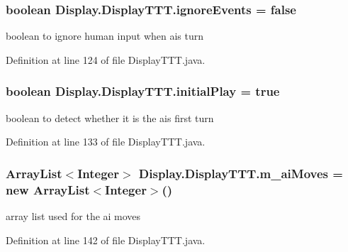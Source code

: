 \subsubsection[{ignore\+Events}]{\setlength{\rightskip}{0pt plus 5cm}boolean Display.\+Display\+T\+T\+T.\+ignore\+Events = false\hspace{0.3cm}{\ttfamily [private]}}\label{class_display_1_1_display_t_t_t_a713fdaab41d88af675c9f54dfcdb87a2}
boolean to ignore human input when ai\textquotesingle{}s turn 

Definition at line 124 of file Display\+T\+T\+T.\+java.

\hypertarget{class_display_1_1_display_t_t_t_a7a6b9526f0a795edccb3911009d74842}{}
\subsubsection[{initial\+Play}]{\setlength{\rightskip}{0pt plus 5cm}boolean Display.\+Display\+T\+T\+T.\+initial\+Play = true\hspace{0.3cm}{\ttfamily [private]}}\label{class_display_1_1_display_t_t_t_a7a6b9526f0a795edccb3911009d74842}
boolean to detect whether it is the ai\textquotesingle{}s first turn 

Definition at line 133 of file Display\+T\+T\+T.\+java.

\hypertarget{class_display_1_1_display_t_t_t_aaa3a8705876d9e60253f6c4599966ae9}{}
\subsubsection[{m\+\_\+ai\+Moves}]{\setlength{\rightskip}{0pt plus 5cm}Array\+List$<$Integer$>$ Display.\+Display\+T\+T\+T.\+m\+\_\+ai\+Moves = new Array\+List$<$Integer$>$()\hspace{0.3cm}{\ttfamily [private]}}\label{class_display_1_1_display_t_t_t_aaa3a8705876d9e60253f6c4599966ae9}
array list used for the ai moves 

Definition at line 142 of file Display\+T\+T\+T.\+java.

\hypertarget{class_display_1_1_display_t_t_t_a3f540c3d30082e201fcb37c9623d6d27}{}
